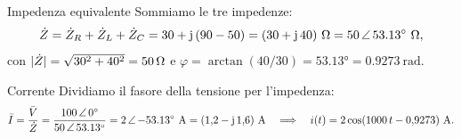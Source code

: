 \documentclass[10pt]{article}
\begin{document}
\begin{passo}{Impedenza equivalente}
Sommiamo le tre impedenze:
\[
  \dot Z = \dot Z_R + \dot Z_L + \dot Z_C = 30 + \jj\,(90 - 50) = (30 + \jj\,40)\ \unit{\ohm}
  = \polare{50}{53.13}\ \unit{\ohm},
\]
con $\lvert\dot Z\rvert = \sqrt{30^2 + 40^2} = \qty{50}{\ohm}$ e $\varphi = \arctan(40/30) = \ang{53.13} = \qty{0.9273}{\radian}$.
\end{passo}

\begin{passo}{Corrente}
Dividiamo il fasore della tensione per l'impedenza:
\[
  \fasore{I} = \frac{\fasore{V}}{\dot Z} = \frac{\polare{100}{0}}{\polare{50}{53.13}}
  = \polare{2}{-53.13}\ \unit{\ampere} = (1{,}2 - \jj\,1{,}6)\ \unit{\ampere}
  \quad\Longrightarrow\quad
  i(t) = 2\cos(1000\,t - 0{,}9273)\ \unit{\ampere}.
\]
\end{passo}
\end{document}
